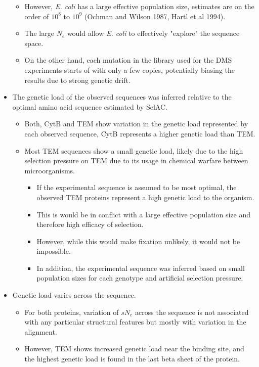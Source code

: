 \documentclass[12pt]{article}
\begin{document}
\begin{itemize}
\begin{itemize}
		\item However, \textit{E. coli} has a large effective population size, estimates are on the order of $10^8$ to $10^9$ (Ochman and Wilson 1987, Hartl et al 1994).
		\item The large $N_e$ would allow \textit{E. coli} to effectively "explore" the sequence space.
		\item On the other hand, each mutation in the library used for the DMS experiments starts of with only a few copies, potentially biasing the results due to strong genetic drift.
	\end{itemize}
	\item The genetic load of the observed sequences was inferred relative to the optimal amino acid sequence estimated by SelAC.
	\begin{itemize}
		\item Both, CytB and TEM show variation in the genetic load represented by each observed sequence, CytB represents a higher genetic load than TEM.
		\item Most TEM sequences show a small genetic load, likely due to the high selection pressure on TEM due to its usage in chemical warfare between microorganisms.
		\begin{itemize}
			\item If the experimental sequence is assumed to be most optimal, the observed TEM proteins represent a high genetic load to the organism. 
			\item This is would be in conflict with a large effective population size and therefore high efficacy of selection.
			\item However, while this would make fixation unlikely, it would not be impossible.
			\item In addition, the experimental sequence was inferred based on small population sizes for each genotype and artificial selection pressure. 
		\end{itemize}
	\end{itemize}
	\item Genetic load varies across the sequence.
	\begin{itemize}
		\item For both proteins, variation of $sN_e$ across the sequence is not associated with any particular structural features but mostly with variation in the alignment.
		\item However, TEM shows increased genetic load near the binding site, and the highest genetic load is found in the last beta sheet of the protein.

\end{itemize}
\end{itemize}
\end{document}
